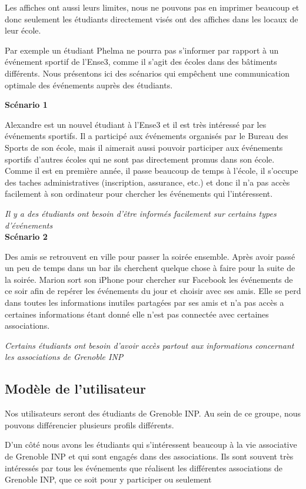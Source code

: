 \documentclass[a4paper, 11px]{article}
\begin{document}
Les affiches ont aussi leurs limites, nous ne pouvons pas en imprimer beaucoup et donc seulement les étudiants directement visés ont des affiches dans les locaux de leur école.

Par exemple un étudiant Phelma ne pourra pas s'informer par rapport à un événement sportif de l'Ense3, comme il s'agit des écoles dans des bâtiments différents.
Nous présentons ici des scénarios qui empêchent une communication optimale des événements auprès des étudiants.

{\bf Scénario 1}

Alexandre est un nouvel étudiant à l'Ense3 et il est très intéressé par les événements sportifs. Il a participé aux événements organisés par le Bureau des Sports de son école, mais il aimerait aussi pouvoir participer aux événements sportifs d'autres écoles qui ne sont pas directement promus dans son école. Comme il est en première année, il passe beaucoup de temps à l'école, il s'occupe des taches administratives (inscription, assurance, etc.) et donc il n'a pas accès facilement à son ordinateur pour chercher les événements qui l'intéressent.

\textit{Il y a des étudiants ont besoin d'être informés facilement sur certains types d'événements}\\

{\bf Scénario 2}

Des amis se retrouvent en ville pour passer la soirée ensemble. Après avoir passé un peu de temps dans un bar ils cherchent quelque chose à faire pour la suite de la soirée. Marion sort son iPhone pour chercher sur Facebook les événements de ce soir afin de repérer les événements du jour et choisir avec ses amis. Elle se perd dans toutes les informations inutiles partagées par ses amis et n'a pas accès a certaines informations étant donné elle n'est pas connectée avec certaines associations.

\textit{Certains étudiants ont besoin d'avoir accès partout aux informations concernant les associations de Grenoble INP}

\subsection{Modèle de l'utilisateur}

Nos utilisateurs seront des étudiants de Grenoble INP. Au sein de ce groupe, nous pouvons différencier plusieurs profils différents.

D'un côté nous avons les étudiants qui s'intéressent beaucoup à la vie associative de Grenoble INP et qui sont engagés dans des associations. Ils sont souvent très intéressés par tous les événements que réalisent les différentes associations de Grenoble INP, que ce soit pour y participer ou seulement
\end{document}
